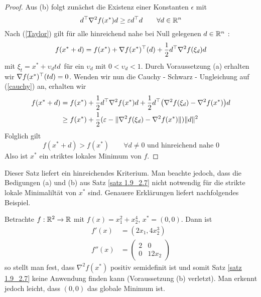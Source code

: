 \begin{proof}
	Aus (b) folgt zunächst die Existenz einer Konstanten $\epsilon$ mit 
	\begin{equation*}
		d^{\top}\nabla^{2} f(x^\ast)d \ge \varepsilon d^{\top}d \qquad \forall d \in \mathbb{R}^{n}
	\end{equation*}
	Nach (\ref{Taylor}) gilt für alle hinreichend nahe bei Null gelegenen $d \in \mathbb{R}^{n}$ :
	\begin{equation}
		f(x^\ast+d) = f(x^\ast) + \nabla f(x^\ast)^{\top}(d) + \dfrac{1}{2}d^{\top} \nabla^{2} f(\xi_{d})d
		\label{cauchy}
	\end{equation}
	mit $\xi_{t} = x^\ast + \upsilon_{d}td \,$ für ein $\upsilon_{d}$ mit $0 < \upsilon_{d} < 1$. Durch Voraussetzung (a) erhalten wir $\nabla f(x^\ast)^{\top}(td) = 0$. Wenden wir nun die Cauchy - Schwarz - Ungleichung auf (\ref{cauchy}) an, erhalten wir 
	\begin{equation*}
	\begin{split}
		f(x^\ast+d)  &= f(x^\ast) + \dfrac{1}{2}d^{\top} \nabla^{2} f(x^\ast)d+ \dfrac{1}{2} d^{\top} \big( \nabla^{2} f(\xi_{d}) - \nabla^{2} f(x^\ast) \big) d \\
		& \ge
		f(x^\ast) + \dfrac{1}{2}(\varepsilon - \Vert \nabla^{2}f(\xi_{d}) - \nabla^{2}f(x^\ast) \Vert) \Vert d \Vert ^{2}
	\end{split}
	\end{equation*}
	Folglich gilt 
	\begin{equation*}
		f(x^\ast +d) > f(x^\ast) \qquad \forall d\neq 0 \text{ und  hinreichend nahe }  0
	\end{equation*}
	Also ist $x^\ast$ ein striktes lokales Minimum von $f$.
\end{proof}

\begin{bemerkung}
	Dieser Satz liefert ein hinreichendes Kriterium. Man beachte jedoch, dass die Bedigungen (a) und (b) aus Satz \ref{satz 1.9_2.7} nicht notwendig für die strikte lokale Minimaliltät von $x^\ast$ sind. Genauere Erklärungen liefert nachfolgendes Beispiel.
\end{bemerkung}

\begin{beispiel}
	Betrachte $ f: \mathbb{R}^{2} \to \mathbb{R} $ mit $f(x) = x_{1}^{2} + x_{2}^{4}$, $x^\ast =(0,0)$.  Dann ist
	\begin{align*}
		f'(x) &=(2x_{1} , 4x_{2}^{3}) \\
		f''(x) &= \begin{pmatrix} 2 & 0 \\ 0 & 12x_{2} \end{pmatrix}
	\end{align*}
	so stellt man fest, dass $\nabla^{2} f(x^\ast)$  positiv semidefinit ist und somit Satz \ref{satz 1.9_2.7} keine Anwendung finden kann (Voraussetzung (b) verletzt). Man erkennt jedoch leicht, dass $(0,0)$ das globale Minimum ist.
\end{beispiel}